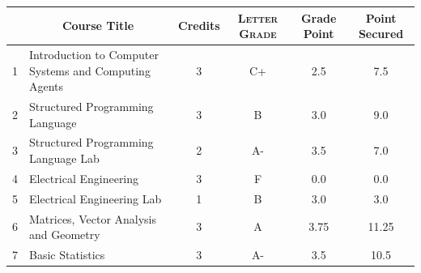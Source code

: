 \documentclass[11pt]{article}
\newcommand*{\numtwo}[1]{\pgfmathprintnumber[
                    fixed, precision=2, fixed zerofill=true]{#1}}
\begin{document}
                \begin{center}
                    \renewcommand{\arraystretch}{1.08}
                    
                \begin{tabular}{|c|l|c|>{\scshape}c|c|c|}
                \hline  \rule[-1ex]{0pt}{3.5ex} {\centering{\bf Course Code}} &  \multicolumn{1}{c|}{\textbf{Course Title}}  & {\bf Credits} & {\bf Letter Grade} & {\bf Grade Point} & {\bf Point Secured}  \\ 
                \hline   1 &  Introduction to Computer Systems and Computing Agents		 & 3 & C+ & 2.5 & 7.5 \\ %
                \hline   2 &  Structured Programming Language		 & 3 & B & 3.0 & 9.0 \\ %
                \hline   3 &  Structured Programming Language Lab		 & 2 & A- & 3.5 & 7.0 \\ %
                \hline   4 &  Electrical Engineering		 & 3 & F & 0.0 & 0.0 \\ %
                \hline   5 &  Electrical Engineering Lab		 & 1 & B & 3.0 & 3.0 \\ %
                \hline   6 &  Matrices, Vector Analysis and Geometry		 & 3 & A & 3.75 & 11.25 \\ %
                \hline   7 &  Basic Statistics		 & 3 & A- & 3.5 & 10.5 \\ %

\hline                %
                \end{tabular}
                \end{center}
                \renewcommand{\arraystretch}{1.03}
\end{document}
